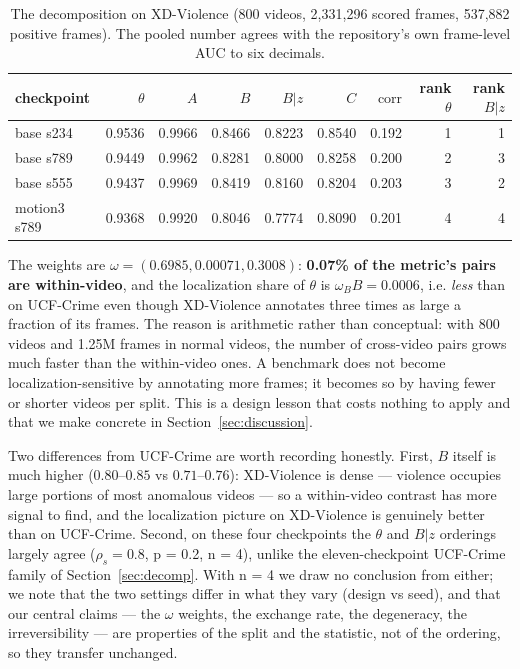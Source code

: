 \documentclass[number,preprint,12pt]{elsarticle}
\begin{document}
\begin{table}[t]
\centering
\small
\caption{The decomposition on XD-Violence (800 videos, 2,331,296 scored
frames, 537,882 positive frames). The pooled number agrees with the
repository's own frame-level AUC to six decimals.}
\label{tab:decomp-xd}
\begin{tabular}{@{}lrrrrrrrr@{}}
\toprule
checkpoint & $\theta$ & $A$ & $B$ & $B|z$ & $C$ & $\mathrm{corr}$ & rank $\theta$ & rank $B|z$ \\
\midrule
base s234    & 0.9536 & 0.9966 & 0.8466 & 0.8223 & 0.8540 & 0.192 & 1 & 1 \\
base s789    & 0.9449 & 0.9962 & 0.8281 & 0.8000 & 0.8258 & 0.200 & 2 & 3 \\
base s555    & 0.9437 & 0.9969 & 0.8419 & 0.8160 & 0.8204 & 0.203 & 3 & 2 \\
motion3 s789 & 0.9368 & 0.9920 & 0.8046 & 0.7774 & 0.8090 & 0.201 & 4 & 4 \\
\bottomrule
\end{tabular}
\end{table}

The weights are \(\omega=(0.6985,0.00071,0.3008)\): \textbf{0.07\% of the metric's pairs
are within-video}, and the localization share of \(\theta\) is \(\omega_B B=0.0006\), i.e.
\emph{less} than on UCF-Crime even though XD-Violence annotates three times as large a
fraction of its frames. The reason is arithmetic rather than conceptual: with
800 videos and 1.25M frames in normal videos, the number of cross-video pairs grows
much faster than the within-video ones. A benchmark does not become
localization-sensitive by annotating more frames; it becomes so by having fewer
or shorter videos per split. This is a design lesson that costs nothing to
apply and that we make concrete in Section~\ref{sec:discussion}.

Two differences from UCF-Crime are worth recording honestly. First, \(B\) itself is
much higher (\(0.80\)--\(0.85\) vs \(0.71\)--\(0.76\)): XD-Violence is dense --- violence
occupies
large portions of most anomalous videos --- so a within-video contrast has more
signal to find, and the localization picture on XD-Violence is genuinely better
than on UCF-Crime. Second, on these four checkpoints the \(\theta\) and \(B|z\) orderings
largely agree (\(\rho_s=0.8\), p = 0.2, n = 4), unlike the eleven-checkpoint
UCF-Crime family of Section~\ref{sec:decomp}. With n = 4 we draw no conclusion from either; we note
that the two settings differ in what they vary (design vs seed), and that our
central claims --- the \(\omega\) weights, the exchange rate, the degeneracy, the
irreversibility --- are properties of the split and the statistic, not of the
ordering, so they transfer unchanged.
\end{document}
